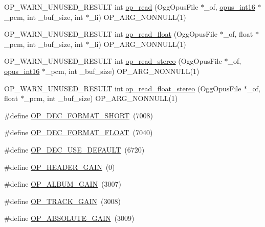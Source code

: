 \begin{DoxyCompactItemize}
\item 
O\+P\+\_\+\+W\+A\+R\+N\+\_\+\+U\+N\+U\+S\+E\+D\+\_\+\+R\+E\+S\+U\+LT int \hyperlink{group__stream__decoding_ga963c917749335e29bb2b698c1cb20a10}{op\+\_\+read} (Ogg\+Opus\+File $\ast$\+\_\+of, \hyperlink{opus__types_8h_acc9ed7cf60479eb81f9648c6ec27dc26}{opus\+\_\+int16} $\ast$\+\_\+pcm, int \+\_\+buf\+\_\+size, int $\ast$\+\_\+li) O\+P\+\_\+\+A\+R\+G\+\_\+\+N\+O\+N\+N\+U\+LL(1)
\item 
O\+P\+\_\+\+W\+A\+R\+N\+\_\+\+U\+N\+U\+S\+E\+D\+\_\+\+R\+E\+S\+U\+LT int \hyperlink{group__stream__decoding_ga73493002d84a234f5e19b70f1dddbe2a}{op\+\_\+read\+\_\+float} (Ogg\+Opus\+File $\ast$\+\_\+of, float $\ast$\+\_\+pcm, int \+\_\+buf\+\_\+size, int $\ast$\+\_\+li) O\+P\+\_\+\+A\+R\+G\+\_\+\+N\+O\+N\+N\+U\+LL(1)
\item 
O\+P\+\_\+\+W\+A\+R\+N\+\_\+\+U\+N\+U\+S\+E\+D\+\_\+\+R\+E\+S\+U\+LT int \hyperlink{group__stream__decoding_gaaca17ad3fd6430dc8fd43308149428eb}{op\+\_\+read\+\_\+stereo} (Ogg\+Opus\+File $\ast$\+\_\+of, \hyperlink{opus__types_8h_acc9ed7cf60479eb81f9648c6ec27dc26}{opus\+\_\+int16} $\ast$\+\_\+pcm, int \+\_\+buf\+\_\+size) O\+P\+\_\+\+A\+R\+G\+\_\+\+N\+O\+N\+N\+U\+LL(1)
\item 
O\+P\+\_\+\+W\+A\+R\+N\+\_\+\+U\+N\+U\+S\+E\+D\+\_\+\+R\+E\+S\+U\+LT int \hyperlink{group__stream__decoding_ga9736f96563500c0978f56f0fd6bdad83}{op\+\_\+read\+\_\+float\+\_\+stereo} (Ogg\+Opus\+File $\ast$\+\_\+of, float $\ast$\+\_\+pcm, int \+\_\+buf\+\_\+size) O\+P\+\_\+\+A\+R\+G\+\_\+\+N\+O\+N\+N\+U\+LL(1)
\item 
\#define \hyperlink{group__stream__decoding_ga55ed1cb616d856a47d618fa099c742aa}{O\+P\+\_\+\+D\+E\+C\+\_\+\+F\+O\+R\+M\+A\+T\+\_\+\+S\+H\+O\+RT}~(7008)
\item 
\#define \hyperlink{group__stream__decoding_gac5c6e0837a5d747fd909aff905f5da3f}{O\+P\+\_\+\+D\+E\+C\+\_\+\+F\+O\+R\+M\+A\+T\+\_\+\+F\+L\+O\+AT}~(7040)
\item 
\#define \hyperlink{group__stream__decoding_gaf421eba19d82d5b0c170b548b8ff79f1}{O\+P\+\_\+\+D\+E\+C\+\_\+\+U\+S\+E\+\_\+\+D\+E\+F\+A\+U\+LT}~(6720)
\item 
\#define \hyperlink{group__stream__decoding_ga846edba35e7470251a6a95b1e2364855}{O\+P\+\_\+\+H\+E\+A\+D\+E\+R\+\_\+\+G\+A\+IN}~(0)
\item 
\#define \hyperlink{group__stream__decoding_ga72d2506ae978f7dbd3a6a59c57f21036}{O\+P\+\_\+\+A\+L\+B\+U\+M\+\_\+\+G\+A\+IN}~(3007)
\item 
\#define \hyperlink{group__stream__decoding_ga51082f7c661488bce9bfdf0e5401fabf}{O\+P\+\_\+\+T\+R\+A\+C\+K\+\_\+\+G\+A\+IN}~(3008)
\item 
\#define \hyperlink{group__stream__decoding_ga4215354abbd19df9eab5a5380dd96cb0}{O\+P\+\_\+\+A\+B\+S\+O\+L\+U\+T\+E\+\_\+\+G\+A\+IN}~(3009)
\end{DoxyCompactItemize}


